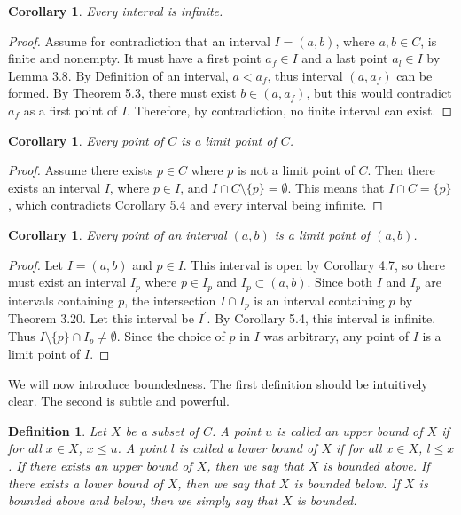 \documentclass{amsart}
\newtheorem{definition}[theorem]{Definition}
\newtheorem{corollary}[theorem]{Corollary}
\newcommand{\1}{\mathds{1}}
\numberwithin{equation}{section}
\numberwithin{theorem}{section}
\begin{document}
\begin{corollary}
Every interval is infinite.
\end{corollary}

\begin{proof}
	Assume for contradiction that an interval $I = (a,b)$, where $a,b\in C$, is finite and nonempty. It must have a first point $a_f\in I$ and a last point $a_l\in I$ by Lemma 3.8. By Definition of an interval, $a<a_f$, thus interval $(a,a_f)$ can be formed. By Theorem 5.3, there must exist $b\in (a,a_f)$, but this would contradict $a_f$ as a first point of $I$. Therefore, by contradiction, no finite interval can exist. 
\end{proof}

\begin{corollary}  Every point of $C$ is a limit point of $C$.  
\end{corollary}

\begin{proof}
	Assume there exists $p\in C$ where $p$ is not a limit point of $C$. Then there exists an interval $I$, where $p\in I$, and $I\cap C\setminus\{p\}=\emptyset$. This means that $I\cap C= \{p\}$, which contradicts Corollary 5.4 and every interval being infinite.
\end{proof}

\begin{corollary} 
Every point of an interval $(a,b)$ is a limit point of $(a,b)$.
\end{corollary}

\begin{proof}
	Let $I = (a,b)$ and $p\in I$. This interval is open by Corollary 4.7, so there must exist an interval $I_p$ where $p\in I_p$ and $I_p\subset (a,b)$. Since both $I$ and $I_p$ are intervals containing $p$, the intersection $I\cap I_p$ is an interval containing $p$ by Theorem 3.20. Let this interval be $I^\prime$. By Corollary 5.4, this interval is infinite. Thus $I\setminus\{p\}\cap I_p \not= \emptyset$. Since the choice of $p$ in $I$ was arbitrary, any point of $I$ is a limit point of $I$.
\end{proof}


We will now introduce boundedness.   The first definition should be intuitively clear.  The second is subtle and powerful.  


\begin{definition}  Let $X$ be a subset of $C$.  A point $u$ is called an \emph{upper bound} of $X$ if for all $x \in X$, $x \leq u$.  A point $l$ is called a \emph{lower bound} of $X$ if for all $x \in X$, $l \leq x$.  If there exists an upper bound of $X$, then we say that $X$ is \emph{bounded above}.  If there exists a lower bound of $X$, then we say that $X$ is \emph{bounded below}.  If $X$ is bounded above and below, then we simply say that $X$ is \emph{bounded}.
\end{definition}
\end{document}
